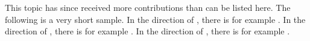 

This topic has since received more contributions than can be listed here.
The following is a very short sample.
In the direction of \citet{zafar2017fairnessconstraints}, there is for example \citet{quadrianto2017recycling,ustun2019fairness,lohaus2020too}.
In the direction of \citet{kamiran2012data}, there is for example \citet{AgaBeyDudLanetal18,roh2021fairbatch}.
In the direction of \citet{hardt2016equality}, there is for example \citet{hebert2018multicalibration}.

